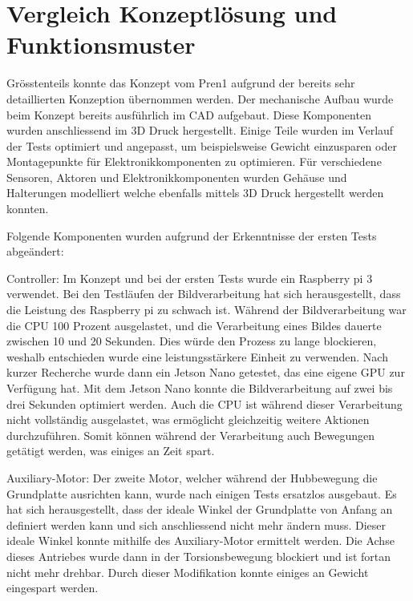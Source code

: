 \section{Vergleich Konzeptlösung und Funktionsmuster}
Grösstenteils konnte das Konzept vom Pren1 aufgrund der bereits sehr detaillierten Konzeption übernommen werden. Der mechanische Aufbau wurde beim Konzept bereits ausführlich im CAD aufgebaut. Diese Komponenten wurden anschliessend im 3D Druck hergestellt. Einige Teile wurden im Verlauf der Tests optimiert und angepasst, um beispielsweise Gewicht einzusparen oder Montagepunkte für Elektronikkomponenten zu optimieren.
Für verschiedene Sensoren, Aktoren und Elektronikkomponenten wurden Gehäuse und Halterungen modelliert welche ebenfalls mittels 3D Druck hergestellt werden konnten.

Folgende Komponenten wurden aufgrund der Erkenntnisse der ersten Tests abgeändert:

Controller:
Im Konzept und bei der ersten Tests wurde ein Raspberry pi 3 verwendet. Bei den Testläufen der Bildverarbeitung hat sich herausgestellt, dass die Leistung des Raspberry pi zu schwach ist. Während der Bildverarbeitung war die CPU 100 Prozent ausgelastet, und die Verarbeitung eines Bildes dauerte zwischen 10 und 20 Sekunden. Dies würde den Prozess zu lange blockieren, weshalb entschieden wurde eine leistungsstärkere Einheit zu verwenden. 
Nach kurzer Recherche wurde dann ein Jetson Nano getestet, das eine eigene GPU zur Verfügung hat. Mit dem Jetson Nano konnte die Bildverarbeitung auf zwei bis drei Sekunden optimiert werden. Auch die CPU ist während dieser Verarbeitung nicht vollständig ausgelastet, was ermöglicht gleichzeitig weitere Aktionen durchzuführen. Somit können während der Verarbeitung auch Bewegungen getätigt werden, was einiges an Zeit spart.

Auxiliary-Motor:
Der zweite Motor, welcher während der Hubbewegung die Grundplatte ausrichten kann, wurde nach einigen Tests ersatzlos ausgebaut. Es hat sich herausgestellt, dass der ideale Winkel der Grundplatte von Anfang an definiert werden kann und sich anschliessend nicht mehr ändern muss. Dieser ideale Winkel konnte mithilfe des Auxiliary-Motor ermittelt werden. Die Achse dieses Antriebes wurde dann in der Torsionsbewegung blockiert und ist fortan nicht mehr drehbar.
Durch dieser Modifikation konnte einiges an Gewicht eingespart werden. 

